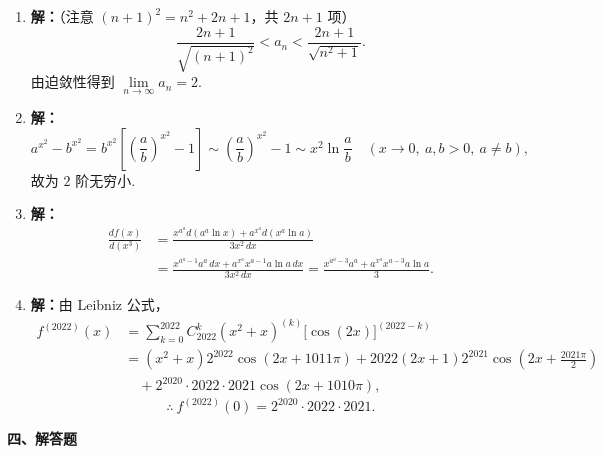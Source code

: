 \documentclass[a4paper,11pt]{ctexart}
\begin{document}
\begin{enumerate}[label=\arabic*., leftmargin=2em, itemsep=0.9em, topsep=0.4em]
  \item \textbf{解：}（注意 $(n+1)^2=n^2+2n+1$，共 $2n+1$ 项）
  \[
    \frac{2n+1}{\sqrt{(n+1)^2}}<a_n<\frac{2n+1}{\sqrt{n^2+1}}.
  \]
  由迫敛性得到 $\lim\limits_{n\to\infty}a_n=2$.

  \item \textbf{解：}
  \[
    a^{x^2}-b^{x^2}=b^{x^2}\left[\left(\frac{a}{b}\right)^{x^2}-1\right]\sim \left(\frac{a}{b}\right)^{x^2}-1\sim x^2\ln\frac{a}{b}\quad (x\to 0,\ a,b>0,\ a\neq b),
  \]
  故为 $2$ 阶无穷小.

  \item \textbf{解：}
  \begin{align*}
    \frac{df(x)}{d(x^3)}
    &=\frac{x^{a^a}d(a^a\ln x)+a^{x^a}d(x^a\ln a)}{3x^2\,dx} \\
    &=\frac{x^{a^a-1}a^a\,dx+a^{x^a}x^{a-1}a\ln a\,dx}{3x^2\,dx}
    =\frac{x^{a^a-3}a^a+a^{x^a}x^{a-3}a\ln a}{3}.
  \end{align*}

  \item \textbf{解：}由 Leibniz 公式，
  \begin{align*}
    f^{(2022)}(x) &= \sum_{k=0}^{2022} C_{2022}^k (x^2+x)^{(k)}\bigl[\cos(2x)\bigr]^{(2022-k)} \\
    &= (x^2+x)2^{2022}\cos(2x+1011\pi) + 2022(2x+1)2^{2021}\cos\!\left(2x+\frac{2021\pi}{2}\right) \\
    &\quad + 2^{2020}\cdot 2022\cdot 2021\cos(2x+1010\pi),
  \end{align*}
  \[
    \therefore\ f^{(2022)}(0)=2^{2020}\cdot 2022\cdot 2021.
  \]
\end{enumerate}

\vspace{0.6em}
\textbf{四、解答题}
\end{document}
